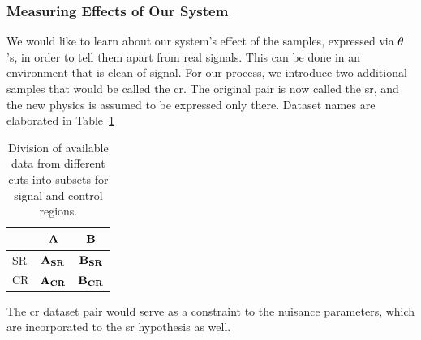\documentclass[../../ddppaper2.tex]{subfiles}
\begin{document}
\subsubsection{Measuring Effects of Our System}

We would like to learn about our system's effect of the samples, expressed via ${\theta}$'s, in order to tell them apart from real signals. This can be done in an environment that is clean of signal. For our process, we introduce two additional samples that would be called the \gls{cr}. The original pair is now called the \gls{sr}, and the new physics is assumed to be expressed only there. Dataset names are elaborated in Table~\ref{table:division_of_data}

\begin{table}[ht]%
\centering
\caption{\label{table:division_of_data}}
\begin{ruledtabular}
\begin{tabular}{| l | c | c |}
 & ${\mathbf{A}}$ & ${\mathbf{B}}$ \\
\hline
SR & ${\mathbf{A_{SR}}}$ & ${\mathbf{B_{SR}}}$ \\
CR & ${\mathbf{A_{CR}}}$ & ${\mathbf{B_{CR}}}$ \\
\end{tabular}
\end{ruledtabular}
\caption{Division of available data from different cuts into subsets for signal and control regions.}
\end{table}

The \gls{cr} dataset pair would serve as a constraint to the nuisance parameters, which are incorporated to the \gls{sr} hypothesis as well.
\end{document}
